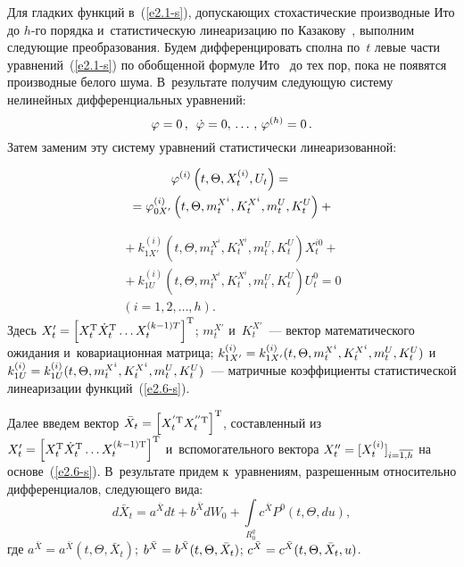 \begin{multicols}{2}
Для гладких функций в~(\ref{e2.1-s}), допускающих стохастические производные Ито до $h$-го 
порядка и~статистическую линеаризацию по Казакову~\cite{1-s, 2-s, 3-s, 4-s},\linebreak 
выполним следующие преобразования.
Будем дифференцировать сполна по~$t$ левые части уравнений~(\ref{e2.1-s}) 
по обобщенной формуле Ито~\cite{1-s, 2-s} до тех пор, пока не появятся производные белого шума. 
В~результате получим сле\-ду\-ющую сис\-те\-му нелинейных дифференциальных уравнений:
\begin{equation}
\varphi=0\,,\enskip \dot {\varphi} =0,\,\ldots\,,\, \varphi^{(h)}=0\,.
\label{e2.5-s}
\end{equation}
%
Затем заменим эту систему уравнений статистически линеаризованной:

\noindent
\begin{multline*}
\varphi^{(i)} \left(t, \Theta, X_t^{(i)}, U_t\right)={}\\
{}=
\varphi_{0X'}^{(i)} \left(t, \Theta, m_t^{X^i}, K_t^{X^i}, m_t^{U},  K_t^{U}\right)+{}
\end{multline*}

\noindent
\begin{multline}
{}+k_{1X'}^{(i)} \left(t, \Theta, m_t^{X^i}, K_t^{X^i}, m_t^{U},  K_t^{U}\right) X_t^{i0} + {}\\
{}+
k_{1U}^{(i)} \left(t, \Theta, m_t^{X^i}, K_t^{X^i}, m_t^{U},  K_t^{U}\right) U_t^0=0\\
 (i=1,2,\ldots,h).
 \label{e2.6-s}
 \end{multline}
Здесь $X_t' =\left[ X_t^{\mathrm{T}} \dot{X}_t^{\mathrm{T}}\ldots X_t^{(k-1)T}\right]^{\mathrm{T}}$; 
$m_t^{X'}$  и~$K_t^{X'}$~--- вектор математического ожидания и~ковариационная матрица; 
$k_{1X'}^{(i)} \hm=k_{1X'}^{(i)} (t, \Theta, m_t^{X^i}, K_t^{X^i}, m_t^{U},  
K_t^{U})$ и~$k_{1U}^{(i)} \hm =k_{1U}^{(i)} (t, \Theta, m_t^{X^i}, K_t^{X^i}, m_t^{U},  K_t^{U})$~--- 
мат\-рич\-ные коэффициенты статистической линеаризации функций~(\ref{e2.6-s}). 

Далее введем вектор
$\bar X_t \hm= \lk X_t^{'\mathrm{T}} X_t^{''\mathrm{T}}\rk^{\mathrm{T}}$, со\-став\-лен\-ный из 
$X_t' \hm= \lk X_t^{\mathrm{T}} \dot{X}_t^{\mathrm{T}}\ldots X_t^{(k-1)\mathrm{T}}\rk^{\mathrm{T}}$ 
и~вспомогательного вектора 
$X_t''\hm=[X_t^{(i)}]_{i=\overline{1,h}}$ на основе~(\ref{e2.6-s}).
В~результате придем к~уравнениям, разрешенным относительно дифференциалов, следующего вида:
\begin{equation}
d\bar X_t = a^{\bar X}  dt + b^{\bar X} d W_0 + \int\limits_{R_0^q} c^{\bar X} P^0(t,\Theta,du),
\label{e2.7-s}
\end{equation}
где $a^{\bar X} = a^{\bar X}(t,\Theta,\bar X_t)$; $b^{\bar X}\hm=b^{\bar X}(t,\Theta,\bar X_t)$; 
$ c^{\bar X}\hm=c^{\bar X}(t,\Theta,\bar X_t, u)$.


\end{multicols}
